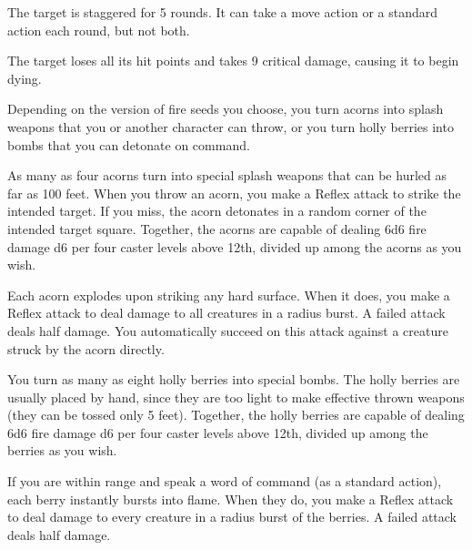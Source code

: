 \spellrng{\rngclose}
\begin{spellhealthy}
  The target is staggered for 5 rounds. It can take a move action or a standard action each round, but not both.
\end{spellhealthy}
\begin{spellblood}
  The target loses all its hit points and takes 9 critical damage, causing it to begin dying.
\end{spellblood}

\spellrng{\rngtouch}
\begin{spelleffect}
  Depending on the version of fire seeds you choose, you turn acorns into splash weapons that you or another character can throw, or you turn holly berries into bombs that you can detonate on command.
  \par {} As many as four acorns turn into special splash weapons that can be hurled as far as 100 feet. When you throw an acorn, you make a Reflex attack to strike the intended target. If you miss, the acorn detonates in a random corner of the intended target square. Together, the acorns are capable of dealing 6d6 fire damage \add d6 per four caster levels above 12th, divided up among the acorns as you wish.
  \par Each acorn explodes upon striking any hard surface. When it does, you make a Reflex attack to deal damage to all creatures in a \areasmall radius burst. A failed attack deals half damage. You automatically succeed on this attack against a creature struck by the acorn directly.
  \par {} You turn as many as eight holly berries into special bombs. The holly berries are usually placed by hand, since they are too light to make effective thrown weapons (they can be tossed only 5 feet). Together, the holly berries are capable of dealing 6d6 fire damage \add d6 per four caster levels above 12th, divided up among the berries as you wish.
  \par If you are within \rngmed range and speak a word of command (as a standard action), each berry instantly bursts into flame. When they do, you make a Reflex attack to deal damage to every creature in a \areamed radius burst of the berries. A failed attack deals half damage.
\end{spelleffect}
